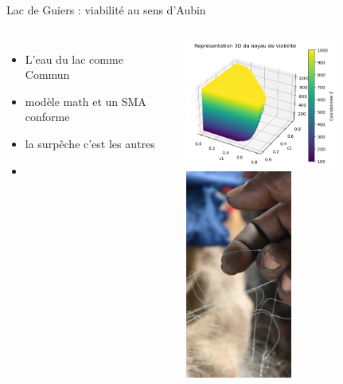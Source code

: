 \documentclass[newPxFont]{beamer}
\begin{document}
\begin{frame}[c]{Lac de Guiers : viabilité au sens d'Aubin}
  \vspace{-1cm}
  \begin{columns}[onlytextwidth,T]
    \column{\dimexpr\linewidth-30mm-5mm}
        \begin{itemize}
          \item L'eau du lac comme Commun
          \item modèle math et un SMA conforme
          \item la surpêche c'est les autres
          \item 
        \end{itemize}
        \includegraphics[width=5cm]{img/noyauViab.png}
    \column{30mm}
    \vspace{0.5cm}
          \includegraphics[width=3.5cm]{img/peche_mbane.JPG}
  \end{columns}
\end{frame}
\end{document}
